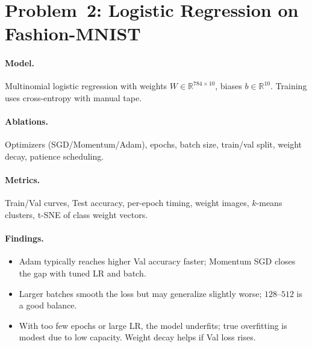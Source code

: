 \documentclass{article}
\begin{document}
\section{Problem~2: Logistic Regression on Fashion-MNIST}
\paragraph{Model.} Multinomial logistic regression with weights $W\in\mathbb{R}^{784\times 10}$, biases $b\in\mathbb{R}^{10}$. Training uses cross-entropy with manual tape.
\paragraph{Ablations.} Optimizers (SGD/Momentum/Adam), epochs, batch size, train/val split, weight decay, patience scheduling.
\paragraph{Metrics.} Train/Val curves, Test accuracy, per-epoch timing, weight images, $k$-means clusters, t-SNE of class weight vectors.

\paragraph{Findings.}
\begin{itemize}
\item Adam typically reaches higher Val accuracy faster; Momentum SGD closes the gap with tuned LR and batch. 
\item Larger batches smooth the loss but may generalize slightly worse; $128$–$512$ is a good balance.
\item With too few epochs or large LR, the model underfits; true overfitting is modest due to low capacity. Weight decay helps if Val loss rises.
\end{itemize}
\end{document}
